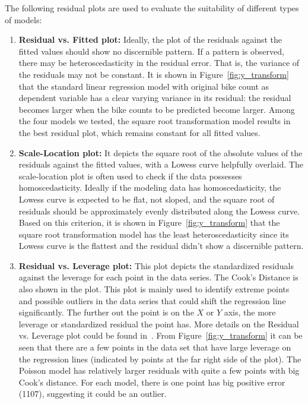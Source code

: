 \documentclass [11pt, proquest] {uwthesis}[2015/03/03]
\begin{document}
The following residual plots are used to evaluate the suitability of different types of models:
\begin{enumerate}
\item \textbf{Residual vs. Fitted plot:} Ideally, the plot of the residuals against the fitted values should show no discernible pattern. If a pattern is observed, there may be heteroscedasticity in the residual error. That is, the variance of the residuals may not be constant. It is shown in Figure~\ref{fig:y_transform} that the standard linear regression model with original bike count as dependent variable has a clear varying variance in its residual: the residual becomes larger when the bike counts to be predicted become larger. Among the four  models we tested, the square root transformation model results in the best residual plot, which remains constant for all fitted values. 
\item \textbf{Scale-Location plot:} It depicts the square root of the absolute values of the residuals against the fitted values, with a Lowess curve helpfully overlaid. The scale-location plot is often used to check if the data possesses homoscedasticity. Ideally if the modeling data has homoscedasticity, the Lowess curve is expected to be flat, not sloped, and the square root of residuals should be approximately evenly distributed along the Lowess curve. Based on this criterion, it is shown in Figure~\ref{fig:y_transform} that the square root transformation model has the least heteroscedasticity since its Lowess curve is the flattest and the residual didn't show a discernible pattern.
\item \textbf{Residual vs. Leverage plot:} This plot depicts the standardized residuals against the leverage for each point in the data series. The Cook's Distance is also shown in the plot. This plot is mainly used to identify extreme points and possible outliers in the data series that could shift the regression line significantly. The further out the point is on the $X$ or $Y$ axis, the more leverage or standardized residual the point has. More details on the Residual vs. Leverage plot could be found in~\cite{gung13}. From Figure~\ref{fig:y_transform} it can be seen that there are a few points in the data set that have large leverage on the regression lines (indicated by points at the far right side of the plot). The Poisson model has relatively larger residuals with quite a few points with big Cook's distance. For each model, there is one point has big positive error (1107), suggesting it could be an outlier. 
\end{enumerate}
\end{document}
